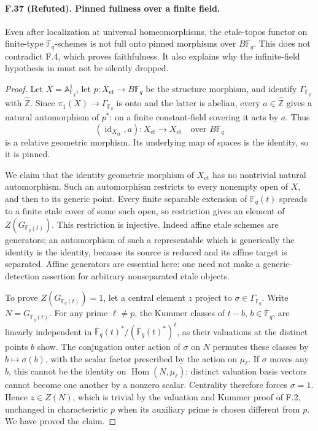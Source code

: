 \paragraph{F.37 (Refuted). Pinned fullness over a finite field.}
Even after localization at universal homeomorphisms, the etale-topos
functor on finite-type $\mathbb F_q$-schemes is not full onto pinned
morphisms over $B\mathbb F_q$. This does not contradict F.4, which proves
faithfulness. It also explains why the infinite-field hypothesis in
\cite[Theorem~0.1]{CHW2024} must not be silently dropped.

\begin{proof}
Let $X=\mathbb A^1_{\mathbb F_q}$, let $p:X_{\mathrm{et}}\to
B\mathbb F_q$ be the structure morphism, and identify
$\Gamma_{\mathbb F_q}$ with $\widehat{\mathbb Z}$. Since
$\pi_1(X)\to\Gamma_{\mathbb F_q}$ is onto and the latter is abelian,
every $a\in\widehat{\mathbb Z}$ gives a natural automorphism of $p^*$:
on a finite constant-field covering it acts by $a$. Thus
\[
 (\operatorname{id}_{X_{\mathrm{et}}},a):
 X_{\mathrm{et}}\longrightarrow X_{\mathrm{et}}
 \quad\text{over }B\mathbb F_q
\]
is a relative geometric morphism. Its underlying map of spaces is the
identity, so it is pinned.

We claim that the identity geometric morphism of $X_{\mathrm{et}}$ has
no nontrivial natural automorphism. Such an automorphism restricts to
every nonempty open of $X$, and then to its generic point. Every finite
separable extension of $\mathbb F_q(t)$ spreads to a finite etale cover
of some such open, so restriction gives an element of
$Z(G_{\mathbb F_q(t)})$. This restriction is injective. Indeed affine
etale schemes are generators; an automorphism of such a representable
which is generically the identity is the identity, because its source
is reduced and its affine target is separated. Affine generators are
essential here: one need not make a generic-detection assertion for
arbitrary nonseparated etale objects.

To prove $Z(G_{\mathbb F_q(t)})=1$, let a central element $z$ project to
$\sigma\in\Gamma_{\mathbb F_q}$. Write
$N=G_{\overline{\mathbb F}_q(t)}$. For any prime $\ell\ne p$, the Kummer
classes of $t-b$, $b\in\overline{\mathbb F}_q$, are linearly independent
in $\overline{\mathbb F}_q(t)^*/(\overline{\mathbb F}_q(t)^*)^\ell$,
as their valuations at the distinct points $b$ show. The conjugation
outer action of $\sigma$ on $N$ permutes these classes by
$b\mapsto\sigma(b)$, with the scalar factor prescribed by the action
on $\mu_\ell$. If $\sigma$ moves any $b$, this cannot be the identity
on $\operatorname{Hom}(N,\mu_\ell)$: distinct valuation basis vectors
cannot become one another by a nonzero scalar. Centrality therefore
forces $\sigma=1$. Hence $z\in Z(N)$, which is trivial by the valuation
and Kummer proof of F.2, unchanged in characteristic $p$ when its auxiliary
prime is chosen different from $p$. We have proved the claim.


\end{proof}
